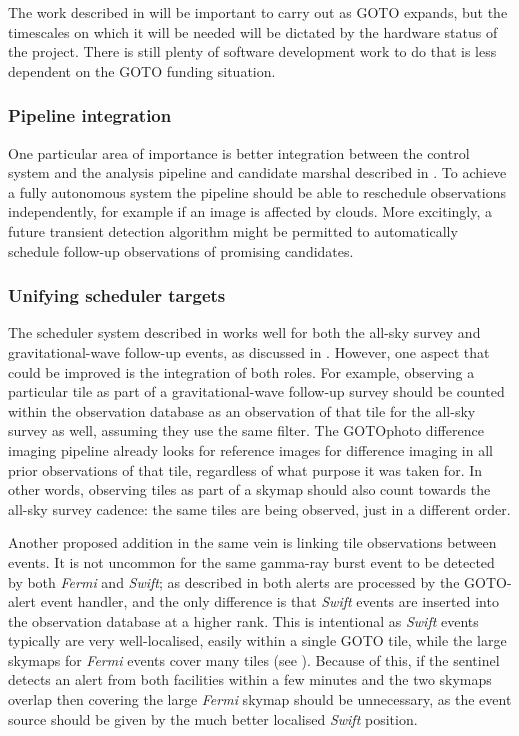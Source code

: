 \begin{colsection}
\begin{colsection}
The work described in  will be important to carry out as GOTO expands, but the timescales on which it will be needed will be dictated by the hardware status of the project. There is still plenty of software development work to do that is less dependent on the GOTO funding situation.

\subsubsection{Pipeline integration}

One particular area of importance is better integration between the control system and the analysis pipeline and candidate marshal described in . To achieve a fully autonomous system the pipeline should be able to reschedule observations independently, for example if an image is affected by clouds. More excitingly, a future transient detection algorithm might be permitted to automatically schedule follow-up observations of promising candidates.

\subsubsection{Unifying scheduler targets}

The scheduler system described in  works well for both the all-sky survey and gravitational-wave follow-up events, as discussed in . However, one aspect that could be improved is the integration of both roles. For example, observing a particular tile as part of a gravitational-wave follow-up survey should be counted within the observation database as an observation of that tile for the all-sky survey as well, assuming they use the same filter. The GOTOphoto difference imaging pipeline already looks for reference images for difference imaging in all prior observations of that tile, regardless of what purpose it was taken for. In other words, observing tiles as part of a skymap should also count towards the all-sky survey cadence: the same tiles are being observed, just in a different order.

\newpage

Another proposed addition in the same vein is linking tile observations between events. It is not uncommon for the same gamma-ray burst event to be detected by both \textit{Fermi} and \textit{Swift}; as described in  both alerts are processed by the GOTO-alert event handler, and the only difference is that \textit{Swift} events are inserted into the observation database at a higher rank. This is intentional as \textit{Swift} events typically are very well-localised, easily within a single GOTO tile, while the large skymaps for \textit{Fermi} events cover many tiles (see ). Because of this, if the sentinel detects an alert from both facilities within a few minutes and the two skymaps overlap then covering the large \textit{Fermi} skymap should be unnecessary, as the event source should be given by the much better localised \textit{Swift} position.


\end{colsection}
\end{colsection}
